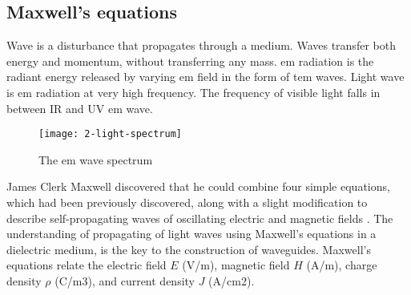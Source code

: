 \documentclass[../report.tex]{subfiles}
\begin{document}
		\subsection{Maxwell's equations}
Wave is a disturbance that propagates through a medium. Waves transfer both energy and momentum, without transferring any mass. \gls{em} radiation is the radiant energy released by varying \gls{em} field in the form of \gls{tem} waves. Light wave is \gls{em} radiation at very high frequency. The frequency of visible light falls in between IR and UV \gls{em} wave.
\begin{figure}[h]
	\centering
	\texttt{[image: 2-light-spectrum]}
	\caption{The \gls{em} wave spectrum}
	\label{fig:2_light_spectrum}
\end{figure}
James Clerk Maxwell discovered that he could combine four simple equations, which had been previously discovered, along with a slight modification to describe self-propagating waves of oscillating electric and magnetic fields \cite{waveparticle_2016}. The understanding of propagating of light waves using Maxwell's equations in a dielectric medium, is the key to the construction of waveguides. Maxwell’s equations relate the electric field $E$ (V/m), magnetic field $H$ (A/m), charge density $\rho$ (C/m3), and current density $J$ (A/cm2).
\end{document}
